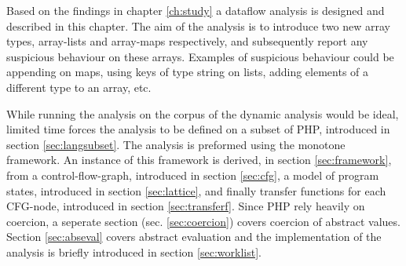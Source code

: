Based on the findings in chapter \ref{ch:study} a dataflow analysis is designed and described in this chapter. The aim of the analysis is to introduce two new array types, array-lists and array-maps respectively, and subsequently report any suspicious behaviour on these arrays. Examples of suspicious behaviour could be appending on maps, using keys of type string on lists, adding elements of a different type to an array, etc. 

While running the analysis on the corpus of the dynamic analysis would be ideal, limited time forces the analysis to be defined on a subset of PHP, introduced in section \ref{sec:langsubset}. The analysis is preformed using the monotone framework. An instance of this framework is derived, in section \ref{sec:framework}, from a control-flow-graph, introduced in section \ref{sec:cfg}, a model of program states, introduced in section \ref{sec:lattice}, and finally transfer functions for each CFG-node, introduced in section \ref{sec:transferf}. Since PHP rely heavily on coercion, a seperate section (sec. \ref{sec:coercion}) covers coercion of abstract values. Section \ref{sec:abseval} covers abstract evaluation and the implementation of the analysis is briefly introduced in section \ref{sec:worklist}.

